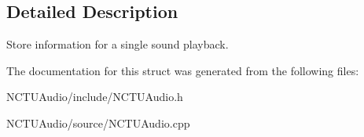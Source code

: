 \subsection{Detailed Description}
Store information for a single sound playback. 

The documentation for this struct was generated from the following files\+:\begin{DoxyCompactItemize}
\item 
N\+C\+T\+U\+Audio/include/N\+C\+T\+U\+Audio.\+h\item 
N\+C\+T\+U\+Audio/source/N\+C\+T\+U\+Audio.\+cpp\end{DoxyCompactItemize}
